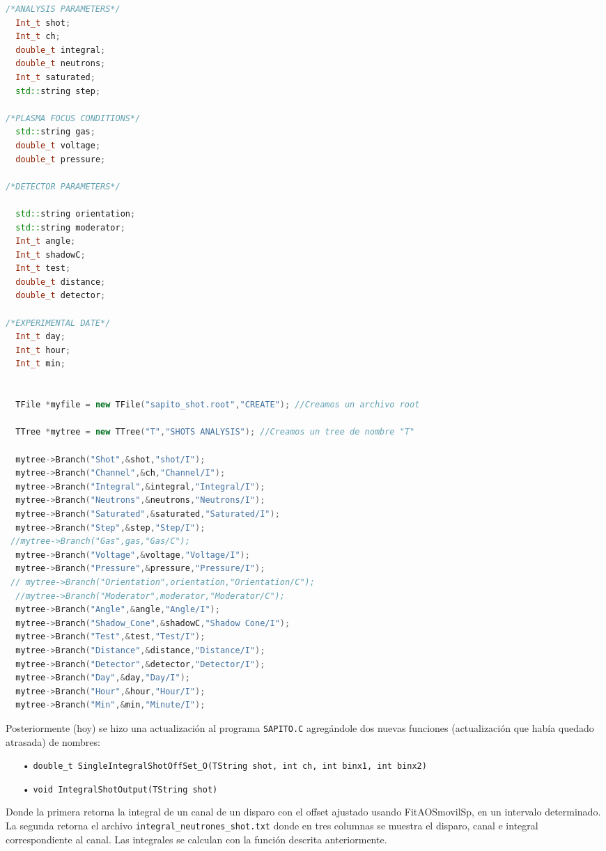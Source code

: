 \documentclass[11pt,letterpaper]{article}
\begin{document}
\begin{lstlisting}[language=C++]
/*ANALYSIS PARAMETERS*/
  Int_t shot;
  Int_t ch;
  double_t integral;
  double_t neutrons;
  Int_t saturated;
  std::string step;
  
/*PLASMA FOCUS CONDITIONS*/
  std::string gas;
  double_t voltage;
  double_t pressure;
  
/*DETECTOR PARAMETERS*/  

  std::string orientation;
  std::string moderator;
  Int_t angle;
  Int_t shadowC;
  Int_t test;
  double_t distance;
  double_t detector;

/*EXPERIMENTAL DATE*/
  Int_t day;
  Int_t hour;
  Int_t min;


  TFile *myfile = new TFile("sapito_shot.root","CREATE"); //Creamos un archivo root
  
  TTree *mytree = new TTree("T","SHOTS ANALYSIS"); //Creamos un tree de nombre "T"
  
  mytree->Branch("Shot",&shot,"shot/I");
  mytree->Branch("Channel",&ch,"Channel/I");
  mytree->Branch("Integral",&integral,"Integral/I");
  mytree->Branch("Neutrons",&neutrons,"Neutrons/I");
  mytree->Branch("Saturated",&saturated,"Saturated/I");
  mytree->Branch("Step",&step,"Step/I");
 //mytree->Branch("Gas",gas,"Gas/C");
  mytree->Branch("Voltage",&voltage,"Voltage/I");
  mytree->Branch("Pressure",&pressure,"Pressure/I");
 // mytree->Branch("Orientation",orientation,"Orientation/C");
  //mytree->Branch("Moderator",moderator,"Moderator/C");
  mytree->Branch("Angle",&angle,"Angle/I");
  mytree->Branch("Shadow_Cone",&shadowC,"Shadow Cone/I");
  mytree->Branch("Test",&test,"Test/I");
  mytree->Branch("Distance",&distance,"Distance/I");
  mytree->Branch("Detector",&detector,"Detector/I");
  mytree->Branch("Day",&day,"Day/I");
  mytree->Branch("Hour",&hour,"Hour/I");
  mytree->Branch("Min",&min,"Minute/I");
  \end{lstlisting}
  
 
Posteriormente (hoy) se hizo una actualización al programa \verb|SAPITO.C| agregándole dos nuevas funciones (actualización que había quedado atrasada) de nombres:

\begin{itemize}
\item[•]  \verb|double_t SingleIntegralShotOffSet_O(TString shot, int ch, int binx1, int binx2)|
\item[•] \verb|void IntegralShotOutput(TString shot)|
\end{itemize}
Donde la primera retorna la integral de un canal de un disparo con el offset ajustado usando FitAOSmovilSp, en un intervalo
determinado. La segunda retorna el archivo \verb|integral_neutrones_shot.txt| donde en tres columnas se muestra el disparo, canal e integral correspondiente al canal. Las integrales se calculan con la función descrita anteriormente.
\end{document}
